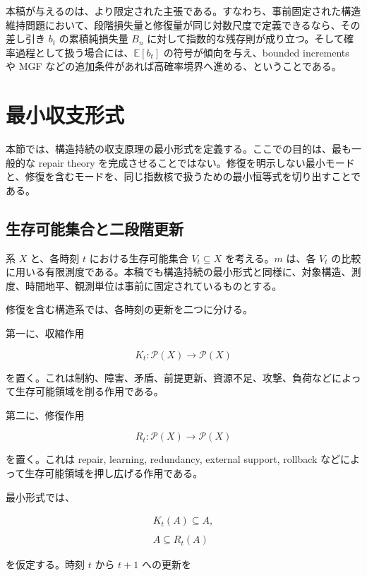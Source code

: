 \documentclass[12pt,a4paper]{article}
\begin{document}
本稿が与えるのは、より限定された主張である。すなわち、事前固定された構造維持問題において、段階損失量と修復量が同じ対数尺度で定義できるなら、その差し引き \(b_{t}\) の累積純損失量 \(B_{n}\) に対して指数的な残存則が成り立つ。そして確率過程として扱う場合には、\(\mathbb E[b_{t}]\) の符号が傾向を与え、bounded increments や MGF などの追加条件があれば高確率境界へ進める、ということである。

\section{最小収支形式}\label{ux6700ux5c0fux53ceux652fux5f62ux5f0f}

本節では、構造持続の収支原理の最小形式を定義する。ここでの目的は、最も一般的な repair theory を完成させることではない。修復を明示しない最小モードと、修復を含むモードを、同じ指数核で扱うための最小恒等式を切り出すことである。

\subsection{生存可能集合と二段階更新}\label{ux751fux5b58ux53efux80fdux96c6ux5408ux3068ux4e8cux6bb5ux968eux66f4ux65b0}

系 \(X\) と、各時刻 \(t\) における生存可能集合 \(V_{t}\subseteq X\) を考える。\(m\) は、各 \(V_{t}\) の比較に用いる有限測度である。本稿でも構造持続の最小形式と同様に、対象構造、測度、時間地平、観測単位は事前に固定されているものとする。

修復を含む構造系では、各時刻の更新を二つに分ける。

第一に、収縮作用

\[
K_{t} : \mathcal P(X) \to \mathcal P(X)
\]

を置く。これは制約、障害、矛盾、前提更新、資源不足、攻撃、負荷などによって生存可能領域を削る作用である。

第二に、修復作用

\[
R_{t} : \mathcal P(X) \to \mathcal P(X)
\]

を置く。これは repair, learning, redundancy, external support, rollback などによって生存可能領域を押し広げる作用である。

最小形式では、

\[
\begin{aligned}
K_{t}(A) \subseteq A, \\
\qquad \\
A \subseteq R_{t}(A)
\end{aligned}
\]

を仮定する。時刻 \(t\) から \(t+1\) への更新を
\end{document}
